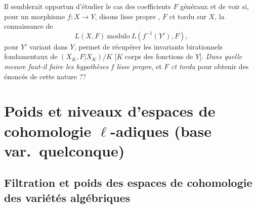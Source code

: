\documentclass[11pt,a4paper]{article}
\begin{document}
Il semblerait opportun d'étudier \struck{\ill{}} le cas des
coefficients $F$ généraux et de voir si, pour un morphisme $f : X \to Y$,
disons lisse propre \struck{\ill{}}, $F$ ct tordu sur $X$, la
connaissance  de 
\[
  L(X, F) \ \text{modulo} \ L(f^{-1}(Y'), F) ,
\]
pour $Y'$ variant dans $Y$, permet de récupérer les invariants birationnels
fondamentaux de $(X_{K}, F|X_{K})/K$ [$K$ corps des fonctions de $Y$].
\emph{Dans quelle mesure faut-il faire les hypothèses} $f$ \emph{lisse
propre}, et $F$ \emph{ct tordu} pour obtenir des énoncés de cette
nature ??

\section{Poids et niveaux d'espaces de cohomologie $\ell$-adiques (base var.\ quelconque)}

\subsection{Filtration et poids des espaces de cohomologie des variétés algébriques}
\end{document}
